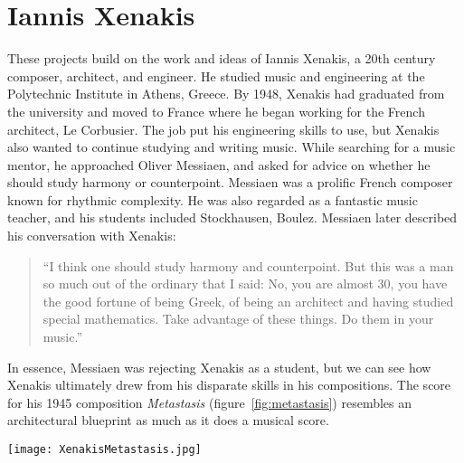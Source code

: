 \section{Iannis Xenakis}
\label{sec:iannis-xenakis}
These projects build on the work and ideas of Iannis Xenakis, a 20th
century composer, architect, and engineer. He studied music and
engineering at the Polytechnic Institute in Athens, Greece. By 1948,
Xenakis had graduated from the university and moved to France where he
began working for the French architect, Le Corbusier. The job put his
engineering skills to use, but Xenakis also wanted to continue
studying and writing music. While searching for a music mentor, he
approached Oliver Messiaen, and asked for advice on whether he should
study harmony or counterpoint. Messiaen was a prolific French composer
known for rhythmic complexity. He was also regarded as a fantastic
music teacher, and his students included Stockhausen, Boulez.
Messiaen later described his conversation with Xenakis:
\begin{quotation}``I think one should study harmony and
  counterpoint. But this was a man so much out of the ordinary that I
  said: No, you are almost 30, you have the good fortune of being
  Greek, of being an architect and having studied special
  mathematics. Take advantage of these things. Do them in your
  music.''\cite{Service2013}
\end{quotation}
In essence, Messiaen was rejecting Xenakis as a student, but we can
see how Xenakis ultimately drew from his disparate skills in his
compositions. The score for his 1945 composition \textit{Metastasis}
(figure~\ref{fig:metastasis}) resembles an architectural blueprint as
much as it does a musical score.

\begin{figure*}[h]
  \texttt{[image: XenakisMetastasis.jpg]}
  \caption{Excerpt from Iannis Xenakis' composition,
    \textit{Metastasis} (1954), measures 309-314. This score in this
    image was then transcribed to sheet music for the orchestral
    performance.}
  \label{fig:metastasis}
\end{figure*}


